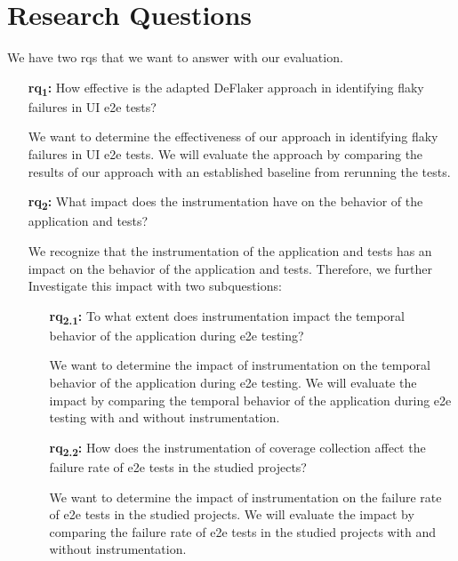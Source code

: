 \section{Research Questions}
We have two \acp{rq} that we want to answer with our evaluation.
\begin{enumerate}
	\item[\textbf{\ac{rq}\textsubscript{1}:}] How effective is the adapted DeFlaker approach in identifying flaky failures in UI \ac{e2e} tests?

		We want to determine the effectiveness of our approach in identifying flaky failures in UI \ac{e2e} tests.
		We will evaluate the approach by comparing the results of our approach with an established baseline from rerunning the tests.
	\item[\textbf{\ac{rq}\textsubscript{2}:}] What impact does the instrumentation have on the behavior of the application and tests?

		We recognize that the instrumentation of the application and tests has an impact on the behavior of the application and tests.
		Therefore, we further Investigate this impact with two subquestions:
		\begin{enumerate}
			\item[\textbf{\ac{rq}\textsubscript{2.1}:}] To what extent does instrumentation impact the temporal behavior of the application during \ac{e2e} testing?

				We want to determine the impact of instrumentation on the temporal behavior of the application during \ac{e2e} testing.
				We will evaluate the impact by comparing the temporal behavior of the application during \ac{e2e} testing with and without instrumentation.
			\item[\textbf{\ac{rq}\textsubscript{2.2}:}] How does the instrumentation of coverage collection affect the failure rate of \ac{e2e} tests in the studied projects?

				We want to determine the impact of instrumentation on the failure rate of \ac{e2e} tests in the studied projects.
				We will evaluate the impact by comparing the failure rate of \ac{e2e} tests in the studied projects with and without instrumentation.
		\end{enumerate}
\end{enumerate}

